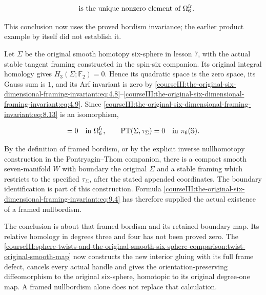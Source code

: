 \begin{equation}
[S^3\times S^3,\tau_{\mathrm{Lie}}]
       \quad\hbox{is the unique nonzero element of }
                                  \Omega^{\mathrm{fr}}_6.
 \label{courseIII:the-original-six-dimensional-framing-invariant:eq:9.3}
\end{equation}

This conclusion now uses the proved bordism invariance; the earlier product example by itself did not establish it.

Let \(\Sigma\) be the original smooth homotopy six-sphere in lesson 7, with the actual stable tangent framing constructed in the spin-six companion. Its original integral homology gives \(H_3(\Sigma;\mathbb F_2)=0\). Hence its quadratic space is the zero space, its Gauss sum is \(1\), and its Arf invariant is zero by \eqref{courseIII:the-original-six-dimensional-framing-invariant:eq:4.8}--\eqref{courseIII:the-original-six-dimensional-framing-invariant:eq:4.9}. Since \eqref{courseIII:the-original-six-dimensional-framing-invariant:eq:8.13} is an isomorphism,

\begin{equation}
[\Sigma,\tau_\Sigma]=0\quad\hbox{in }\Omega^{\mathrm{fr}}_6,
 \qquad
              \operatorname{PT}(\Sigma,\tau_\Sigma)=0
                                      \quad\hbox{in }\pi_6(\mathbb S).
 \label{courseIII:the-original-six-dimensional-framing-invariant:eq:9.4}
\end{equation}

By the definition of framed bordism, or by the explicit inverse nullhomotopy construction in the Pontryagin--Thom companion, there is a compact smooth seven-manifold \(W\) with boundary the original \(\Sigma\) and a stable framing which restricts to the specified \(\tau_\Sigma\), after the stated appended coordinates. The boundary identification is part of this construction. Formula \eqref{courseIII:the-original-six-dimensional-framing-invariant:eq:9.4} has therefore supplied the actual existence of a framed nullbordism.

The conclusion is about that framed bordism and its retained boundary map. Its relative homology in degrees three and four has not been proved zero. The \cref{courseIII:sphere-twists-and-the-original-smooth-six-sphere-comparison:twist-original-smooth-map} now constructs the new interior gluing with its full frame defect, cancels every actual handle and gives the orientation-preserving diffeomorphism to the original six-sphere, homotopic to its original degree-one map. A framed nullbordism alone does not replace that calculation.

